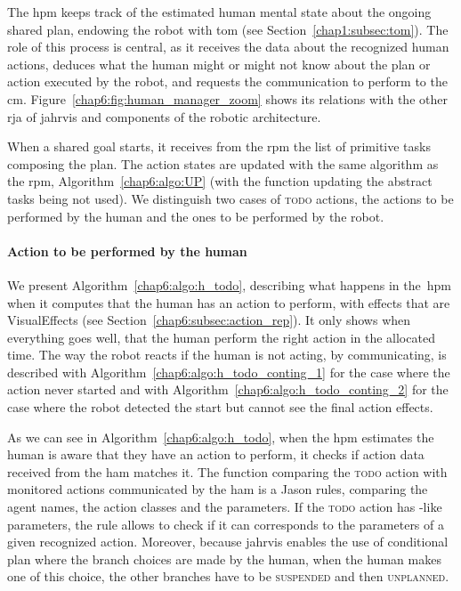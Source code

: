 \documentclass[a4paper,11pt,twoside]{StyleThese}
\begin{document}
The \acrfull{hpm} keeps track of the estimated human mental state about the ongoing shared plan, endowing the robot with \acrlong{tom} (see Section~\ref{chap1:subsec:tom}). The role of this process is central, as it receives the data about the recognized human actions, deduces what the human might or might not know about the plan or action executed by the robot, and requests the communication to perform to the \acrfull{cm}. Figure~\ref{chap6:fig:human_manager_zoom} shows its relations with the other \acrshort{rja} of \acrshort{jahrvis} and components of the robotic architecture.

When a shared goal starts, it receives from the \acrshort{rpm} the list of primitive tasks composing the plan. The action states are updated with the same algorithm as the \acrshort{rpm}, Algorithm~\ref{chap6:algo:UP} (with the function updating the abstract tasks being not used). We distinguish two cases of \textsc{todo} actions, the actions to be performed by the human and the ones to be performed by the robot.

\paragraph{Action to be performed by the human} We present Algorithm~\ref{chap6:algo:h_todo}, describing what happens in the~\acrshort{hpm} when it computes that the human has an action to perform, with effects that are VisualEffects (see Section~\ref{chap6:subsec:action_rep}). It only shows when everything goes well, \ie that the human perform the right action in the allocated time. The way the robot reacts if the human is not acting, by communicating, is described with Algorithm~\ref{chap6:algo:h_todo_conting_1} for the case where the action never started and with Algorithm~\ref{chap6:algo:h_todo_conting_2} for the case where the robot detected the start but cannot see the final action effects.

As we can see in Algorithm~\ref{chap6:algo:h_todo}, when the \acrshort{hpm} estimates the human is aware that they have an action to perform, it checks if action data received from the \acrlong{ham} matches it. The function comparing the \textsc{todo} action with monitored actions communicated by the \acrshort{ham} is a Jason rules, comparing the agent names, the action classes and the parameters. If the \textsc{todo} action has \sparql-like parameters, the rule allows to check if it can corresponds to the parameters of a given recognized action. Moreover, because \acrshort{jahrvis} enables the use of conditional plan where the branch choices are made by the human, when the human makes one of this choice, the other branches have to be \textsc{suspended} and then \textsc{unplanned}.
\end{document}
